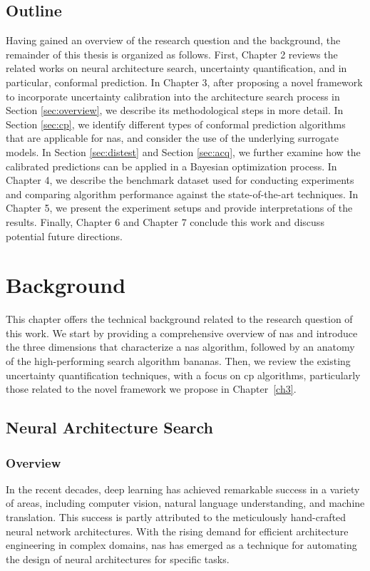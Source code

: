 \documentclass[a4paper,oneside,bibliography=totoc]{scrbook}
\begin{document}
\section{Outline}
Having gained an overview of the research question and the background, the remainder of this thesis is organized as follows. First, Chapter 2 reviews the related works on neural architecture search, uncertainty quantification, and in particular, conformal prediction. In Chapter 3, after proposing a novel framework to incorporate uncertainty calibration into the architecture search process in Section \ref{sec:overview}, we describe its methodological steps in more detail. In Section \ref{sec:cp}, we identify different types of conformal prediction algorithms that are applicable for \gls{nas}, and consider the use of the underlying surrogate models. In Section \ref{sec:distest} and Section \ref{sec:acq}, we further examine how the calibrated predictions can be applied in a Bayesian optimization process. In Chapter 4, we describe the benchmark dataset used for conducting experiments and comparing algorithm performance against the state-of-the-art techniques. In Chapter 5, we present the experiment setups and provide interpretations of the results. Finally, Chapter 6 and Chapter 7 conclude this work and discuss potential future directions.


\chapter{Background}
This chapter offers the technical background related to the research question of this work. We start by providing a comprehensive overview of \gls{nas} and introduce the three dimensions that characterize a \gls{nas} algorithm, followed by an anatomy of the high-performing search algorithm \gls{bananas}. Then, we review the existing uncertainty quantification techniques, with a focus on \gls{cp} algorithms, particularly those related to the novel framework we propose in Chapter~\ref{ch3}.

\section{Neural Architecture Search}
\subsection{Overview}
\label{sec: nas}
In the recent decades, deep learning has achieved remarkable success in a variety of areas, including computer vision, natural language understanding, and machine translation. This success is partly attributed to the meticulously hand-crafted neural network architectures. With the rising demand for efficient architecture engineering in complex domains, \gls{nas} has emerged as a technique for automating the design of neural architectures for specific tasks.
 
\end{document}
